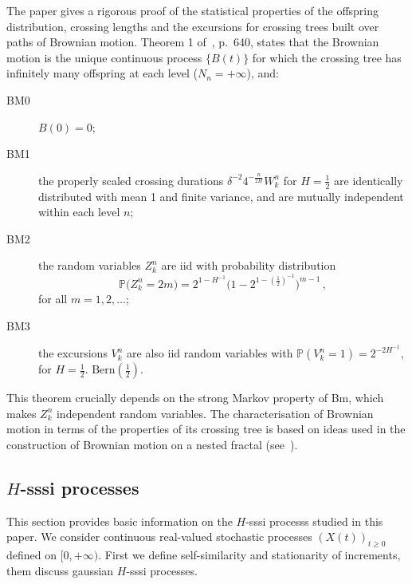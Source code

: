 \documentclass[a4paper]{article}
\newcommand{\pr}{\mathbb{P}}
\begin{document}
The paper \cite{ECP1673} gives a rigorous proof of the statistical properties of
the offspring distribution, crossing lengths and the excursions for crossing trees
built over paths of Brownian motion. Theorem 1 of~\cite{ECP1673}, p.~640, states
that the Brownian motion is the unique continuous process $\{B(t)\}$ for which the
crossing tree has infinitely many offspring at each level ($N_n = +\infty$), and:
\begin{description}
    \item[BM0] $B(0) = 0$;
    \item[BM1] the properly scaled crossing durations $\delta^{-2} 4^{-\frac{n}{2H}} W_k^n$
    for $H = \tfrac{1}{2}$ are identically distributed with mean 1 and finite variance,
    and are mutually independent within each level $n$;
    \item[BM2] the random variables $Z_k^n$ are iid with probability distribution
    \[ \pr\bigl(Z_k^n=2m\bigr) = 2^{1-H^{-1}}\bigl(1-2^{1-(\frac{1}{2})^{-1}}\bigr)^{m-1} \,,\]
    for all $m=1,2,\ldots$;
    \item[BM3] the excursions $V_k^n$ are also iid random variables with 
    $\pr( V_k^n = 1 ) = 2^{-2H^{-1}}$, for $H = \tfrac{1}{2}$.
    $\text{Bern}(\tfrac{1}{2})$.
\end{description}
This theorem crucially depends on the strong Markov property of Bm, which makes $Z_k^n$
independent random variables. The characterisation of Brownian motion in terms of
the properties of its crossing tree is based on ideas used in the construction of
Brownian motion on a nested fractal (see~\cite{BarlowPerkins88}).



\subsection{$H$-sssi processes} %
\label{sub:h_sssi_processes}

This section provides basic information on the $H$-sssi processs studied in this 
paper. We consider continuous real-valued stochastic processes $(X(t))_{t\geq0}$
defined on $[0,+\infty)$. First we define self-similarity and stationarity of increments,
them discuss gaussian $H$-sssi processes.
\end{document}

